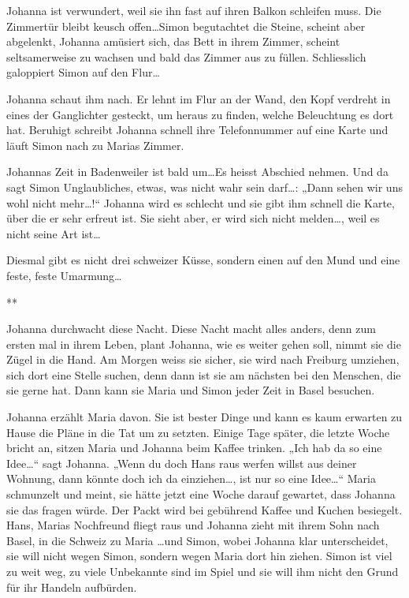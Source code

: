\documentclass[10pt,titlepage,a5paper]{book}
\newcommand{\sterne}{\par{\centering ***\par}}
\begin{document}
Johanna ist verwundert, weil sie ihn fast auf ihren Balkon schleifen muss. Die Zimmertür bleibt keusch offen\dots  Simon begutachtet die Steine, scheint aber abgelenkt, Johanna amüsiert sich, das Bett in ihrem Zimmer, scheint seltsamerweise zu wachsen und bald das Zimmer aus zu füllen. Schliesslich galoppiert Simon auf den Flur\dots 

 Johanna schaut ihm nach. Er lehnt im Flur an der Wand, den Kopf verdreht in eines der Ganglichter gesteckt, um heraus zu finden, welche Beleuchtung es dort hat. Beruhigt schreibt Johanna schnell ihre Telefonnummer auf eine Karte und läuft Simon nach zu Marias Zimmer.
 
Johannas Zeit in Badenweiler  ist bald um\dots  Es heisst Abschied nehmen. Und da sagt Simon Unglaubliches, etwas, was nicht wahr sein darf\dots : „Dann sehen wir uns wohl nicht mehr\dots !“  Johanna wird es schlecht und sie gibt ihm schnell die Karte, über die er sehr erfreut ist. Sie sieht aber, er wird sich nicht melden\dots , weil es nicht seine Art ist\dots 

Diesmal gibt es nicht drei schweizer Küsse, sondern einen auf den Mund und eine feste, feste Umarmung\dots 

\sterne

Johanna durchwacht diese Nacht. Diese Nacht macht alles anders, denn zum ersten mal in ihrem Leben, plant Johanna, wie es weiter gehen soll, nimmt sie die Zügel in die Hand. Am Morgen weiss sie sicher, sie wird nach Freiburg umziehen, sich dort eine Stelle suchen, denn dann ist sie am nächsten bei den Menschen, die sie gerne hat. Dann kann sie Maria und Simon  jeder Zeit in Basel besuchen.

Johanna erzählt Maria davon. Sie ist bester Dinge und kann es kaum erwarten zu Hause die Pläne in die Tat um zu setzten. Einige Tage später, die letzte Woche bricht an, sitzen Maria und Johanna beim Kaffee trinken. „Ich hab da so eine Idee\dots “ sagt Johanna. „Wenn du doch Hans raus werfen willst aus deiner Wohnung, dann könnte doch ich da einziehen\dots , ist nur so eine Idee\dots “ Maria schmunzelt und meint, sie hätte jetzt eine Woche darauf gewartet, dass Johanna sie das fragen würde. Der Packt wird bei gebührend Kaffee und Kuchen besiegelt. Hans, Marias Nochfreund fliegt raus und Johanna zieht mit ihrem Sohn nach Basel, in die Schweiz zu Maria \dots und Simon, wobei Johanna klar unterscheidet, sie will nicht wegen Simon, sondern wegen Maria dort hin ziehen. Simon ist viel zu weit weg, zu viele Unbekannte sind im Spiel und sie will ihm nicht den Grund für ihr Handeln aufbürden.
\end{document}
